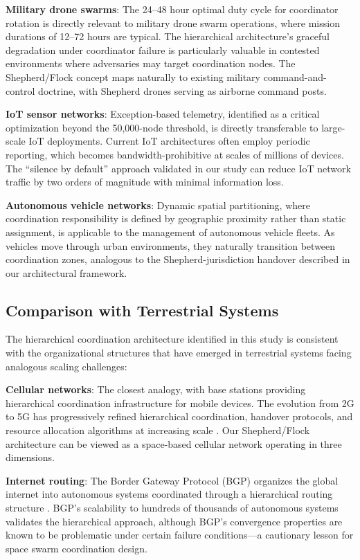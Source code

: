 \documentclass[journal]{IEEEtran}
\begin{document}
\textbf{Military drone swarms}: The 24--48 hour optimal duty cycle for coordinator rotation is directly relevant to military drone swarm operations, where mission durations of 12--72 hours are typical. The hierarchical architecture's graceful degradation under coordinator failure is particularly valuable in contested environments where adversaries may target coordination nodes. The Shepherd/Flock concept maps naturally to existing military command-and-control doctrine, with Shepherd drones serving as airborne command posts.

\textbf{IoT sensor networks}: Exception-based telemetry, identified as a critical optimization beyond the 50{,}000-node threshold, is directly transferable to large-scale IoT deployments. Current IoT architectures often employ periodic reporting, which becomes bandwidth-prohibitive at scales of millions of devices. The ``silence by default'' approach validated in our study can reduce IoT network traffic by two orders of magnitude with minimal information loss.

\textbf{Autonomous vehicle networks}: Dynamic spatial partitioning, where coordination responsibility is defined by geographic proximity rather than static assignment, is applicable to the management of autonomous vehicle fleets. As vehicles move through urban environments, they naturally transition between coordination zones, analogous to the Shepherd-jurisdiction handover described in our architectural framework.

\subsection{Comparison with Terrestrial Systems}

The hierarchical coordination architecture identified in this study is consistent with the organizational structures that have emerged in terrestrial systems facing analogous scaling challenges:

\textbf{Cellular networks}: The closest analogy, with base stations providing hierarchical coordination infrastructure for mobile devices. The evolution from 2G to 5G has progressively refined hierarchical coordination, handover protocols, and resource allocation algorithms at increasing scale \cite{rappaport_wireless}. Our Shepherd/Flock architecture can be viewed as a space-based cellular network operating in three dimensions.

\textbf{Internet routing}: The Border Gateway Protocol (BGP) organizes the global internet into autonomous systems coordinated through a hierarchical routing structure \cite{rekhter_bgp}. BGP's scalability to hundreds of thousands of autonomous systems validates the hierarchical approach, although BGP's convergence properties are known to be problematic under certain failure conditions---a cautionary lesson for space swarm coordination design.
\end{document}

